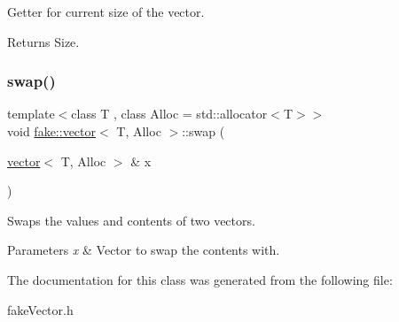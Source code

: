 Getter for current size of the vector. 

\begin{DoxyReturn}{Returns}
Size. 
\end{DoxyReturn}
\mbox{\label{classfake_1_1vector_ac480f82e092e044293c38539b4db9430}} 
\subsubsection{\texorpdfstring{swap()}{swap()}}
{\footnotesize\ttfamily template$<$class T , class Alloc  = std\+::allocator$<$\+T$>$$>$ \\
void \mbox{\hyperlink{classfake_1_1vector}{fake\+::vector}}$<$ T, Alloc $>$\+::swap (\begin{DoxyParamCaption}\item[{\mbox{\hyperlink{classfake_1_1vector}{vector}}$<$ T, Alloc $>$ \&}]{x }\end{DoxyParamCaption})\hspace{0.3cm}{\ttfamily [inline]}}



Swaps the values and contents of two vectors. 


\begin{DoxyParams}{Parameters}
{\em x} & Vector to swap the contents with. \\
\hline
\end{DoxyParams}


The documentation for this class was generated from the following file\+:\begin{DoxyCompactItemize}
\item 
fake\+Vector.\+h\end{DoxyCompactItemize}
